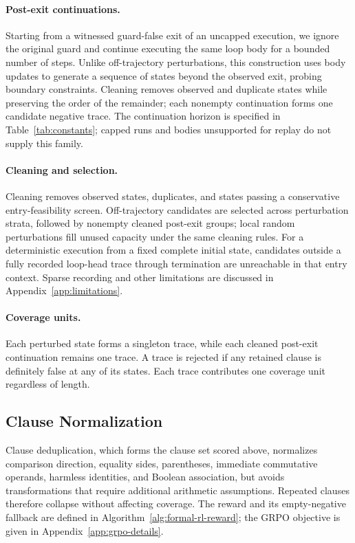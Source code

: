\paragraph{Post-exit continuations.}
Starting from a witnessed guard-false exit of an uncapped execution, we ignore
the original guard and continue executing the same loop body for a bounded
number of steps.  Unlike off-trajectory perturbations, this construction uses
body updates to generate a sequence of states beyond the observed exit,
probing boundary constraints.  Cleaning removes observed and duplicate states
while preserving the order of the remainder; each nonempty continuation forms
one candidate negative trace.  The continuation horizon is specified in
Table~\ref{tab:constants}; capped runs and bodies unsupported for replay do not
supply this family.

\paragraph{Cleaning and selection.}
Cleaning removes observed states, duplicates, and states passing a conservative
entry-feasibility screen.  Off-trajectory candidates are selected across
perturbation strata, followed by nonempty cleaned post-exit groups; local
random perturbations fill unused capacity under the same cleaning rules.
For a deterministic execution from a fixed complete initial state, candidates
outside a fully recorded loop-head trace through termination are unreachable
in that entry context.  Sparse recording and other limitations are discussed
in Appendix~\ref{app:limitations}.

\paragraph{Coverage units.}
Each perturbed state forms a singleton trace, while each cleaned post-exit
continuation remains one trace.  A trace is rejected if any retained clause
is definitely false at any of its states.  Each trace contributes one coverage
unit regardless of length.

\subsection{Clause Normalization}

Clause deduplication, which forms the clause set scored above,
normalizes comparison direction, equality sides, parentheses, immediate
commutative operands, harmless identities, and Boolean association, but
avoids transformations that require additional arithmetic assumptions.
Repeated clauses therefore collapse without affecting coverage.
The reward and its empty-negative fallback are defined in
Algorithm~\ref{alg:formal-rl-reward}; the GRPO objective is given in
Appendix~\ref{app:grpo-details}.

